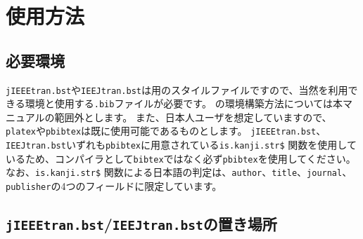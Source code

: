 \documentclass[10pt, a4paper]{jsarticle}
\renewcommand{\refname}{\small 参考文献}
\begin{document}
\begin{bibunit}[IEEJtran]
  \nocite{Incollection,jpIncollection1,jpIncollection2,enIncollection1}
  \renewcommand{\refname}{\small 参考文献(IEEJtran.bst)}
  {\small \putbib[incollection]}
\end{bibunit}
\begin{bibunit}[jIEEEtran]
  \nocite{Incollection,jpIncollection1,jpIncollection2,enIncollection1}
  \renewcommand{\refname}{\small 参考文献(jIEEEtran.bst)}
  {\small \putbib[incollection]}
\end{bibunit}
\begin{bibunit}[IEEJtran]
  \nocite{enIncollection1/ej/jpIncollection1}
  \renewcommand{\refname}{\small 英日を併記した参考文献(IEEJtran.bst)}
  {\small \putbib[incollection]}
\end{bibunit}
\begin{bibunit}[jIEEEtran]
  \nocite{enIncollection1/ej/jpIncollection1}
  \renewcommand{\refname}{\small 英日を併記した参考文献(jIEEEtran.bst)}
  {\small \putbib[incollection]}
\end{bibunit}




\section{使用方法}

\subsection{必要環境}

\texttt{jIEEEtran.bst}や\texttt{IEEJtran.bst}は\BibTeX 用のスタイルファイルですので、当然\BibTeX を利用できる環境と使用する\texttt{.bib}ファイルが必要です。
\BibTeX の環境構築方法については本マニュアルの範囲外とします。
また、日本人ユーザを想定していますので、\texttt{platex}や\texttt{pbibtex}は既に使用可能であるものとします。
\texttt{jIEEEtran.bst}、\texttt{IEEJtran.bst}いずれも\texttt{pbibtex}に用意されている\texttt{is.kanji.str\$} 関数を使用しているため、\BibTeX コンパイラとして\texttt{bibtex}ではなく必ず\texttt{pbibtex}を使用してください。
なお、\texttt{is.kanji.str\$} 関数による日本語の判定は、\texttt{author}、\texttt{title}、\texttt{journal}、\texttt{publisher}の4つのフィールドに限定しています。



\subsection{\texttt{jIEEEtran.bst}/\texttt{IEEJtran.bst}の置き場所}
\end{document}
